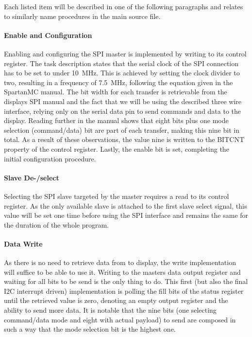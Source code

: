 	   		Each listed item will be described in one of the following paragraphs and relates to similarly name procedures in the main source file.

	   		\paragraph{Enable and Configuration} %
	   		\label{par:enable}
	   			Enabling and configuring the SPI master is implemented by writing to its control register. The task description states that the serial clock of the SPI connection has to be set to under \SI{10}{\mega\hertz}. This is achieved by setting the clock divider to two, resulting in a frequency of \SI{7.5}{\mega\hertz}, following the equation given in the SpartanMC manual. The bit width for each transfer is retrievable from the displays SPI manual and the fact that we will be using the described three wire interface, relying only on the serial data pin to send commands and data to the display. Reading further in the manual shows that eight bits plus one mode selection (command/data) bit are part of each transfer, making this nine bit in total. As a result of these observations, the value nine is written to the BITCNT property of the control register. Lastly, the enable bit is set, completing the initial configuration procedure.

	   		\paragraph{Slave De-/select} %
	   		\label{par:slave_de_select}
	   			Selecting the SPI slave targeted by the master requires a read to its control register. As the only available slave is attached to the first slave select signal, this value will be set one time before using the SPI interface and remains the same for the duration of the whole program.

	   		\paragraph{Data Write} %
	   		\label{par:data_write}
	   			As there is no need to retrieve data from to display, the write implementation will suffice to be able to use it. Writing to the masters data output register and waiting for all bits to be send is the only thing to do. This first (but also the final I2C interrupt driven) implementation is polling the fill bits of the status register until the retrieved value is zero, denoting an empty output register and the ability to send more data.
	   			It is notable that the nine bits (one selecting command/data mode and eight with actual payload) to send are composed in such a way that the mode selection bit is the highest one.

